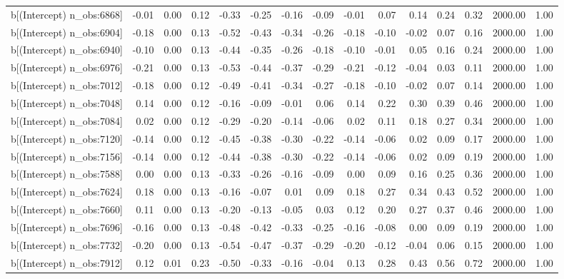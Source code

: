 \begin{table}[ht]
\begin{tabular}{rrrrrrrrrrrrrrr}
  b[(Intercept) n\_obs:6868] & -0.01 & 0.00 & 0.12 & -0.33 & -0.25 & -0.16 & -0.09 & -0.01 & 0.07 & 0.14 & 0.24 & 0.32 & 2000.00 & 1.00 \\ 
  b[(Intercept) n\_obs:6904] & -0.18 & 0.00 & 0.13 & -0.52 & -0.43 & -0.34 & -0.26 & -0.18 & -0.10 & -0.02 & 0.07 & 0.16 & 2000.00 & 1.00 \\ 
  b[(Intercept) n\_obs:6940] & -0.10 & 0.00 & 0.13 & -0.44 & -0.35 & -0.26 & -0.18 & -0.10 & -0.01 & 0.05 & 0.16 & 0.24 & 2000.00 & 1.00 \\ 
  b[(Intercept) n\_obs:6976] & -0.21 & 0.00 & 0.13 & -0.53 & -0.44 & -0.37 & -0.29 & -0.21 & -0.12 & -0.04 & 0.03 & 0.11 & 2000.00 & 1.00 \\ 
  b[(Intercept) n\_obs:7012] & -0.18 & 0.00 & 0.12 & -0.49 & -0.41 & -0.34 & -0.27 & -0.18 & -0.10 & -0.02 & 0.07 & 0.14 & 2000.00 & 1.00 \\ 
  b[(Intercept) n\_obs:7048] & 0.14 & 0.00 & 0.12 & -0.16 & -0.09 & -0.01 & 0.06 & 0.14 & 0.22 & 0.30 & 0.39 & 0.46 & 2000.00 & 1.00 \\ 
  b[(Intercept) n\_obs:7084] & 0.02 & 0.00 & 0.12 & -0.29 & -0.20 & -0.14 & -0.06 & 0.02 & 0.11 & 0.18 & 0.27 & 0.34 & 2000.00 & 1.00 \\ 
  b[(Intercept) n\_obs:7120] & -0.14 & 0.00 & 0.12 & -0.45 & -0.38 & -0.30 & -0.22 & -0.14 & -0.06 & 0.02 & 0.09 & 0.17 & 2000.00 & 1.00 \\ 
  b[(Intercept) n\_obs:7156] & -0.14 & 0.00 & 0.12 & -0.44 & -0.38 & -0.30 & -0.22 & -0.14 & -0.06 & 0.02 & 0.09 & 0.19 & 2000.00 & 1.00 \\ 
  b[(Intercept) n\_obs:7588] & 0.00 & 0.00 & 0.13 & -0.33 & -0.26 & -0.16 & -0.09 & 0.00 & 0.09 & 0.16 & 0.25 & 0.36 & 2000.00 & 1.00 \\ 
  b[(Intercept) n\_obs:7624] & 0.18 & 0.00 & 0.13 & -0.16 & -0.07 & 0.01 & 0.09 & 0.18 & 0.27 & 0.34 & 0.43 & 0.52 & 2000.00 & 1.00 \\ 
  b[(Intercept) n\_obs:7660] & 0.11 & 0.00 & 0.13 & -0.20 & -0.13 & -0.05 & 0.03 & 0.12 & 0.20 & 0.27 & 0.37 & 0.46 & 2000.00 & 1.00 \\ 
  b[(Intercept) n\_obs:7696] & -0.16 & 0.00 & 0.13 & -0.48 & -0.42 & -0.33 & -0.25 & -0.16 & -0.08 & 0.00 & 0.09 & 0.19 & 2000.00 & 1.00 \\ 
  b[(Intercept) n\_obs:7732] & -0.20 & 0.00 & 0.13 & -0.54 & -0.47 & -0.37 & -0.29 & -0.20 & -0.12 & -0.04 & 0.06 & 0.15 & 2000.00 & 1.00 \\ 
  b[(Intercept) n\_obs:7912] & 0.12 & 0.01 & 0.23 & -0.50 & -0.33 & -0.16 & -0.04 & 0.13 & 0.28 & 0.43 & 0.56 & 0.72 & 2000.00 & 1.00 \\ 

\end{tabular}
\end{table}
